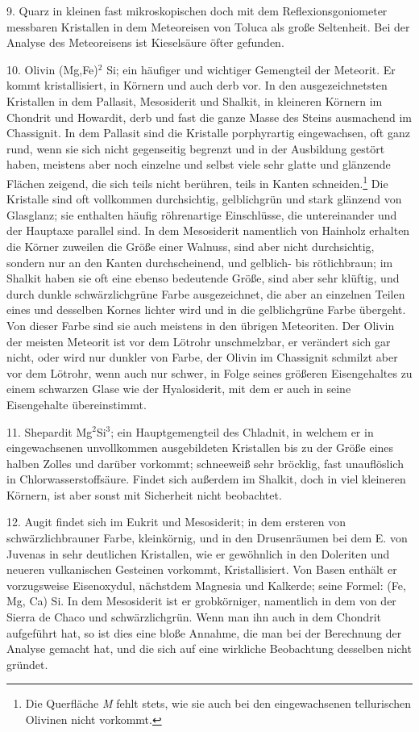 \documentclass[a4paper, 11pt, oneside]{article}
\begin{document}
9. Quarz in kleinen fast mikroskopischen doch mit dem Reflexionsgoniometer messbaren Kristallen in dem Meteoreisen von Toluca als große Seltenheit. Bei der Analyse des Meteoreisens ist Kieselsäure öfter gefunden.

10. Olivin (Mg,Fe)$^{2}$ Si; ein häufiger und wichtiger Gemengteil der Meteorit. Er kommt kristallisiert, in Körnern und auch derb vor. In den ausgezeichnetsten Kristallen in dem Pallasit, Mesosiderit und Shalkit, in kleineren Körnern im Chondrit und Howardit, derb und fast die ganze Masse des Steins ausmachend im Chassignit. In dem Pallasit sind die Kristalle porphyrartig eingewachsen, oft ganz rund, wenn sie sich nicht gegenseitig begrenzt und in der Ausbildung gestört haben, meistens aber noch einzelne und selbst viele sehr glatte und glänzende Flächen zeigend, die sich teils nicht berühren, teils in Kanten schneiden.\footnote{Die Querfläche \emph{M} fehlt stets, wie sie auch bei den eingewachsenen tellurischen Olivinen nicht vorkommt.} Die Kristalle sind oft vollkommen durchsichtig, gelblichgrün und stark glänzend von Glasglanz; sie enthalten häufig röhrenartige Einschlüsse, die untereinander und der Hauptaxe parallel sind. In dem Mesosiderit namentlich von Hainholz erhalten die Körner zuweilen die Größe einer Walnuss, sind aber nicht durchsichtig, sondern nur an den Kanten durchscheinend, und gelblich- bis rötlichbraun; im Shalkit haben sie oft eine ebenso bedeutende Größe, sind aber sehr klüftig, und durch dunkle schwärzlichgrüne Farbe ausgezeichnet, die aber an einzelnen Teilen eines und desselben Kornes lichter wird und in die gelblichgrüne Farbe übergeht. Von dieser Farbe sind sie auch meistens in den übrigen Meteoriten. Der Olivin der meisten Meteorit ist vor dem Lötrohr unschmelzbar, er verändert sich gar nicht, oder wird nur dunkler von Farbe, der Olivin im Chassignit schmilzt aber vor dem Lötrohr, wenn auch nur schwer, in Folge seines größeren Eisengehaltes zu einem schwarzen Glase wie der Hyalosiderit, mit dem er auch in seine Eisengehalte übereinstimmt.

11. Shepardit Mg$^{2}$Si$^{3}$; ein Hauptgemengteil des Chladnit, in welchem er in eingewachsenen unvollkommen ausgebildeten Kristallen bis zu der Größe eines halben Zolles und darüber vorkommt; schneeweiß sehr bröcklig, fast unauflöslich in Chlorwasserstoffsäure. Findet sich außerdem im Shalkit, doch in viel kleineren Körnern, ist aber sonst mit Sicherheit nicht beobachtet.

12. Augit findet sich im Eukrit und Mesosiderit; in dem ersteren von schwärzlichbrauner Farbe, kleinkörnig, und in den Drusenräumen bei dem E. von Juvenas in sehr deutlichen Kristallen, wie er gewöhnlich in den Doleriten und neueren vulkanischen Gesteinen vorkommt, Kristallisiert. Von Basen enthält er vorzugsweise Eisenoxydul, nächstdem Magnesia und Kalkerde; seine Formel: (Fe, Mg, Ca) Si. In dem Mesosiderit ist er grobkörniger, namentlich in dem von der Sierra de Chaco und schwärzlichgrün. Wenn man ihn auch in dem Chondrit aufgeführt hat, so ist dies eine bloße Annahme, die man bei der Berechnung der Analyse gemacht hat, und die sich auf eine wirkliche Beobachtung desselben nicht gründet.
\end{document}
